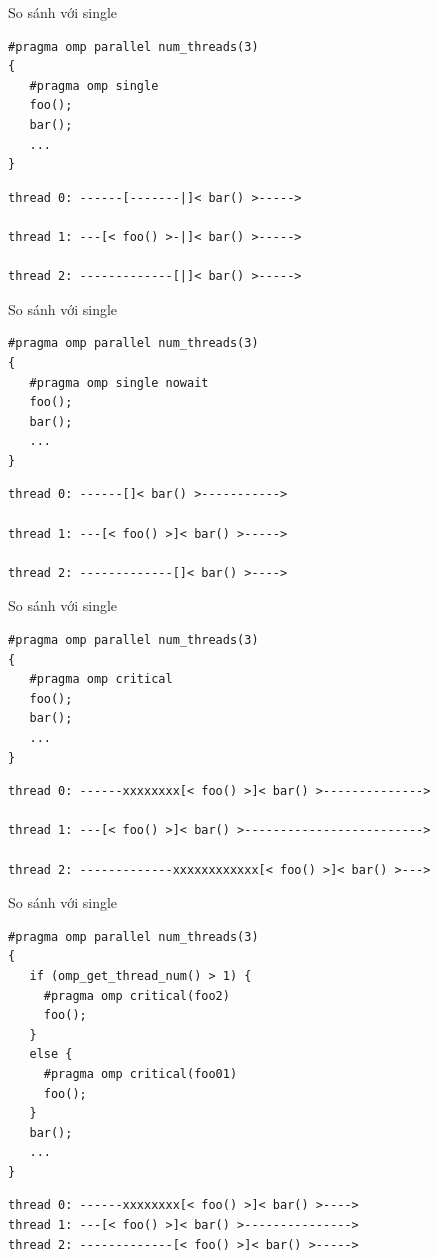 \documentclass[10pt]{beamer}
\theoremstyle{remark}
\numberwithin{algocf}{section}
\numberwithin{equation}{section}
\numberwithin{dl}{section}
\numberwithin{figure}{section}
\begin{document}
\begin{frame}[fragile]{So sánh với single}
    \begin{verbatim}
#pragma omp parallel num_threads(3)
{
   #pragma omp single
   foo();
   bar();
   ...
}
    \end{verbatim}
    \begin{verbatim}
thread 0: ------[-------|]< bar() >----->

thread 1: ---[< foo() >-|]< bar() >----->

thread 2: -------------[|]< bar() >----->
    \end{verbatim}
\end{frame}

\begin{frame}[fragile]{So sánh với single}
    \begin{verbatim}
#pragma omp parallel num_threads(3)
{
   #pragma omp single nowait
   foo();
   bar();
   ...
}
    \end{verbatim}
    \begin{verbatim}
thread 0: ------[]< bar() >----------->

thread 1: ---[< foo() >]< bar() >----->

thread 2: -------------[]< bar() >---->
    \end{verbatim}
\end{frame}

\begin{frame}[fragile]{So sánh với single}
    \begin{verbatim}
#pragma omp parallel num_threads(3)
{
   #pragma omp critical
   foo();
   bar();
   ...
}
    \end{verbatim}
    \begin{verbatim}
thread 0: ------xxxxxxxx[< foo() >]< bar() >-------------->

thread 1: ---[< foo() >]< bar() >------------------------->

thread 2: -------------xxxxxxxxxxxx[< foo() >]< bar() >--->
    \end{verbatim}
\end{frame}

\begin{frame}{So sánh với single}
    \begin{verbatim}
#pragma omp parallel num_threads(3)
{
   if (omp_get_thread_num() > 1) {
     #pragma omp critical(foo2)
     foo();
   }
   else {
     #pragma omp critical(foo01)
     foo();
   }
   bar();
   ...
}
    \end{verbatim}
    \begin{verbatim}
thread 0: ------xxxxxxxx[< foo() >]< bar() >---->
thread 1: ---[< foo() >]< bar() >--------------->
thread 2: -------------[< foo() >]< bar() >----->
    \end{verbatim}
\end{frame}
\end{document}
